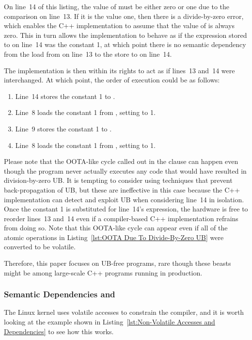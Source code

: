 \documentclass[10]{article}
\begin{document}
On line~14 of this listing, the value of  must be either zero
or one due to the comparison on line~13.
If it is the value one, then there is a divide-by-zero error, which
enables the C++ implementation to assume that the value of  is
always zero.
This in turn allows the implementation to behave as if the expression
stored to  on line~14 was the constant 1, at which point there
is no semantic dependency from the load from  on line~13 to the
store to  on line~14.

The implementation is then within its rights to act as if lines~13 and~14
were interchanged.
At which point, the order of execution could be as follows:

\begin{enumerate}
\item	Line~14 stores the constant 1 to .
\item	Line~8 loads the constant 1 from , setting  to 1.
\item	Line~9 stores the constant 1 to .
\item	Line~8 loads the constant 1 from , setting  to 1.
\end{enumerate}

Please note that the OOTA-like cycle called out in the 
clause can happen even though the program never actually executes any
code that would have resulted in division-by-zero UB.
It is tempting to consider using techniques
that prevent back-propagation of UB, but these are ineffective in this
case because the C++ implementation can detect and exploit UB when
considering line~14 in isolation.
Once the constant 1 is substituted for line~14's expression, the
hardware is free to reorder lines~13 and~14 even if a compiler-based
C++ implementation refrains from doing so.
Note that this OOTA-like cycle can appear even if all of the atomic
operations in
Listing~\ref{lst:OOTA Due To Divide-By-Zero UB}
were converted to be volatile.

Therefore, this paper focuses on UB-free programs, rare though these
beasts might be among large-scale C++ programs running in production.

\subsubsection{Semantic Dependencies and }
\label{app:Semantic Dependencies and volatile}

The Linux kernel uses volatile accesses to constrain the compiler,
and it is worth looking at the example shown in
Listing~\ref{lst:Non-Volatile Accesses and Dependencies}
to see how this works.
\end{document}
